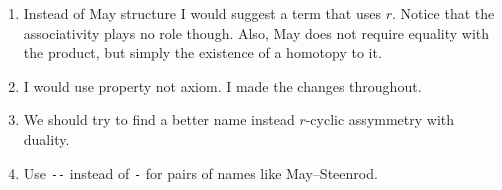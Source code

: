 \documentclass{report}
\begin{document}
	\begin{enumerate}
		\item Instead of May structure I would suggest a term that uses $r$.
		Notice that the associativity plays no role though.
		Also, May does not require equality with the product, but simply the existence of a homotopy to it.

		\item I would use property not axiom. I made the changes throughout.

		\item We should try to find a better name instead $r$-cyclic assymmetry with duality.

		\item Use \verb|--| instead of \verb|-| for pairs of names like May--Steenrod.
	\end{enumerate}
\end{document}
